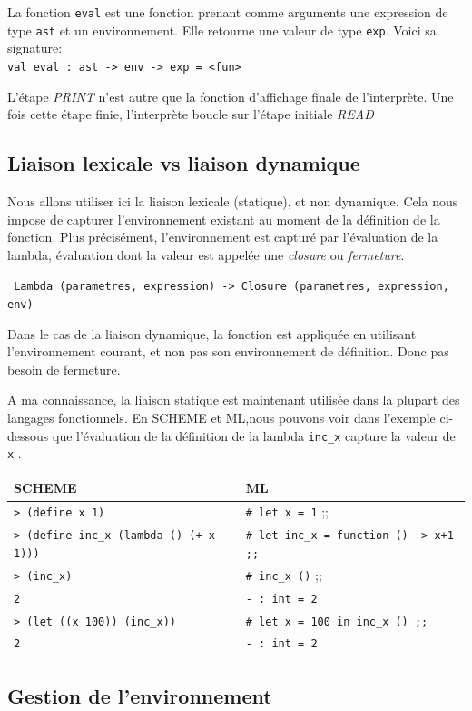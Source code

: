 \documentclass[11pt]{book}
\begin{document}
La fonction \verb+eval+ est une fonction prenant comme arguments une expression de type \verb+ast+ et un environnement.
Elle retourne une valeur de type \verb+exp+. Voici sa signature: \\
\verb+val eval : ast -> env -> exp = <fun>+

L'étape \textit{PRINT} n'est autre que la fonction d'affichage finale de l'interpr\`{e}te.
Une fois cette étape finie, l'interprète boucle sur l'étape initiale \textit{READ}

\subsection{Liaison lexicale vs liaison dynamique}
Nous allons utiliser ici  la liaison lexicale (statique), et non dynamique.
 Cela nous impose de capturer l'environnement existant au moment de la d\'{e}finition de la fonction. 
Plus précisément, l'environnement est captur\'{e} par l'\'{e}valuation de la lambda, \'{e}valuation dont la valeur est appelée une \textit{closure}
ou \textit{fermeture}. 


\verb+ Lambda (parametres, expression) -> Closure (parametres, expression, env) +    


Dans le cas de la liaison dynamique, la fonction est appliqu\'{e}e en utilisant l'environnement courant, 
et non pas son environnement de définition. Donc pas besoin de fermeture.

A ma connaissance, la liaison statique est maintenant utilisée dans la plupart des langages fonctionnels.
En SCHEME et ML,nous pouvons voir dans l'exemple ci-dessous que l'\'{e}valuation de la d\'{e}finition de la
 lambda \verb+inc_x+ capture la valeur de \verb+x+ .


\begin{tabular}{l|l} \hline
SCHEME & ML \\ \hline 
\verb!> (define x 1)! & \verb+# let x = 1+ ;; \\
\verb!> (define inc_x (lambda () (+ x 1)))! & \verb!# let inc_x = function () -> x+1 ;;! \\
\verb!> (inc_x)! & \verb!# inc_x ()! ;; \\ 
\verb!2! & \verb+- : int = 2+ \\
\verb!> (let ((x 100)) (inc_x))! &  \verb!# let x = 100 in inc_x () ;;! \\
\verb!2! & \verb+- : int = 2+  \\
\end{tabular}


\subsection{Gestion de l'environnement}
\end{document}
